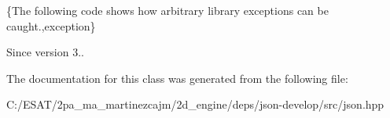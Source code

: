 \{The following code shows how arbitrary library exceptions can be caught.,exception\}

\begin{DoxySince}{Since}
version 3.. 
\end{DoxySince}


The documentation for this class was generated from the following file\+:\begin{DoxyCompactItemize}
\item 
C\+:/\+E\+S\+A\+T/2pa\+\_\+ma\+\_\+martinezcajm/2d\+\_\+engine/deps/json-\/develop/src/json.\+hpp\end{DoxyCompactItemize}
